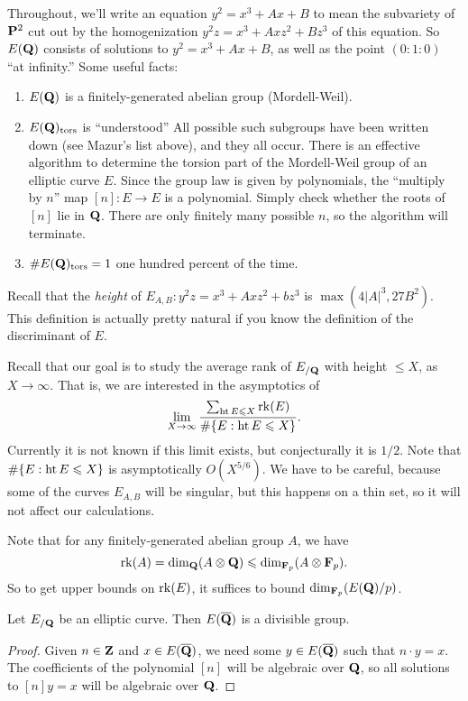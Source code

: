 Throughout, we'll write an equation $y^2=x^3+A x+B$ to mean the subvariety of 
$\mathbf{P}^2$ cut out by the homogenization $y^2 z=x^3+A x z^2+B z^3$ of this 
equation. So $E(\mathbf{Q})$ consists of solutions to $y^2=x^3+A x+B$, as well as the 
point $(0:1:0)$ ``at infinity.'' Some useful facts:
\begin{enumerate}
\item
$E(\mathbf{Q})$ is a finitely-generated abelian group (Mordell-Weil). 

\item
$E(\mathbf{Q})_\mathrm{tors}$ is ``understood'' All possible such 
subgroups have been written down (see Mazur's list above), and they all 
occur. There is an effective algorithm to determine the torsion part of the 
Mordell-Weil group of an elliptic curve $E$. Since the group law is given by 
polynomials, the ``multiply by $n$'' map $[n]:E\to E$ is a polynomial. 
Simply check whether the roots of $[n]$ lie in $\mathbf{Q}$. There are only finitely 
many possible $n$, so the algorithm will terminate. 

\item
$\#E(\mathbf{Q})_\mathrm{tors}=1$ one hundred percent of the time. 
\end{enumerate}

Recall that the \emph{height} of $E_{A,B}:y^2 z=x^3+A x z^2+b z^3$ is 
$\max(4|A|^3,27 B^2)$. This definition is actually 
pretty natural if you know the definition of the discriminant of $E$. 

Recall that our goal is to study the average rank of $E_{/\mathbf{Q}}$ with height 
$\leqslant X$, as $X\to \infty$. That is, we are interested in the asymptotics 
of 
\[
  \lim_{X\to \infty} \frac{\sum_{\operatorname{ht} E\leqslant X} \operatorname{rk}(E)}{\#\{E:\operatorname{ht} E\leqslant X\}} .
\]
Currently it is not known if this limit exists, but conjecturally it is $1/2$. 
Note that $\#\{E:\operatorname{ht} E\leqslant X\}$ is asymptotically 
$O(X^{5/6})$. We 
have to be careful, because some of the curves $E_{A,B}$ will be singular, but 
this happens on a thin set, so it will not affect our calculations. 

Note that for any finitely-generated abelian group $A$, we have 
\[
  \operatorname{rk}(A) = \dim_{\mathbf{Q}}(A\otimes\mathbf{Q}) \leqslant \dim_{\mathbf{F}_p}(A\otimes\mathbf{F}_p) .
\]
So to get upper bounds on $\operatorname{rk}(E)$, it suffices to bound 
$\dim_{\mathbf{F}_p}(E(\mathbf{Q})/p)$. 

\begin{theorem}
Let $E_{/\mathbf{Q}}$ be an elliptic curve. Then $E(\overline{\mathbf{Q}})$ is a divisible 
group. 
\end{theorem}
\begin{proof}
Given $n\in \mathbf{Z}$ and $x\in E(\overline{\mathbf{Q}})$, we need some $y\in E(\overline{\mathbf{Q}})$ 
such that $n\cdot y=x$. The coefficients of the polynomial $[n]$ will be 
algebraic over $\mathbf{Q}$, so all solutions to $[n] y=x$ will be algebraic over $\mathbf{Q}$. 
\end{proof}


